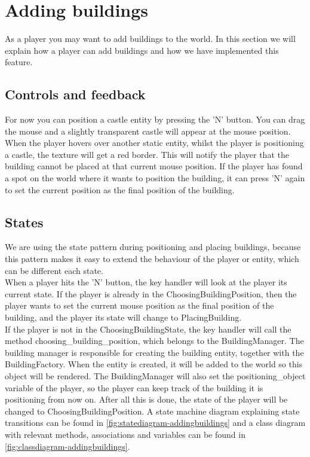 \section{Adding buildings}
\label{sec:addingbuildings}
As a player you may want to add buildings to the world. In this section we will explain how a player can add buildings and how we have implemented this feature.

\subsection{Controls and feedback}
For now you can position a castle entity by pressing the 'N' button. You can drag the mouse and a slightly transparent castle will appear at the mouse position. When the player hovers over another static entity, whilst the player is positioning a castle, the texture will get a red border. This will notify the player that the building cannot be placed at that current mouse position. If the player has found a spot on the world where it wants to position the building, it can press 'N' again to set the current position as the final position of the building.

\subsection{States}
We are using the state pattern during positioning and placing buildings, because this pattern makes it easy to extend the behaviour of the player or entity, which can be different each state.\\
When a player hits the 'N' button, the key handler will look at the player its current state. If the player is already in the ChoosingBuildingPosition, then the player wants to 
set the current mouse position as the final position of the building, and the player its state will change to PlacingBuilding.\\
If the player is not in the ChoosingBuildingState, the key handler will call the method 
choosing\_building\_position, which belongs to the BuildingManager. The building manager is responsible for creating the building entity, together with the BuildingFactory.
When the entity is created, it will be added to the world so this object will be rendered.
The BuildingManager will also set the positioning\_object variable of the player, so the player can keep track of the building it is positioning from now on. After all this is done, the state of the player will be changed to ChoosingBuildingPosition.
A state machine diagram explaining state transitions can be found in \cref{fig:statediagram-addingbuildings} and a class diagram with relevant methods, associations and variables can be found in \cref{fig:classdiagram-addingbuildings}.

